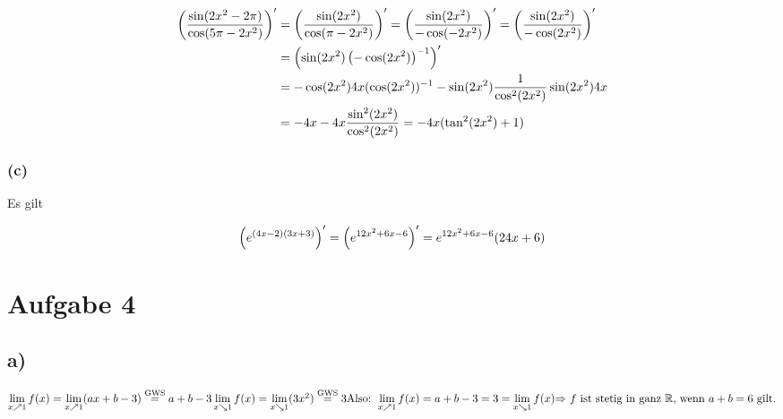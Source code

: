 \documentclass[a4paper, 11pt]{article}
\begin{document}
\begin{align*}
    \left(\frac{\sin(2x^2 - 2\pi)}{\cos(5\pi - 2x^2)}\right)' &=
        \left(\frac{\sin(2x^2)}{\cos(\pi - 2x^2)}\right)' =
        \left(\frac{\sin(2x^2)}{-\cos(-2x^2)}\right)' =
        \left(\frac{\sin(2x^2)}{-\cos(2x^2)}\right)' \\
    &= \left(\sin(2x^2)\left({-\cos(2x^2)}\right)^{-1}\right)' \\
    &= -\cos(2x^2) 4x (\cos(2x^2))^{-1} -
            \sin(2x^2) \frac{1}{\cos^2(2x^2)} \sin(2x^2) 4x \\
    &= -4x - 4x \frac{\sin^2(2x^2)}{\cos^2(2x^2)} = -4x(\tan^2(2x^2) + 1)
\end{align*}

\subsubsection{(c)}
\label{sec:org5a7f910}
Es gilt

$$ \left(e^{(4x - 2)(3x + 3)}\right)' = \left(e^{12x^2 + 6x - 6}\right)' =
    e^{12x^2 + 6x - 6}(24x + 6) $$

\section{Aufgabe 4}
\label{sec:org6d184ba}
\subsection{a)}
\label{sec:org886c75b}
\begin{math}
    \lim \limits_{x \nearrow 1} f(x) =
        \lim \limits_{x \nearrow 1} (ax + b - 3)
        \overset{\text{GWS}}{=} a + b - 3
    \newline
    \newline
    \lim \limits_{x \searrow 1} f(x) =
        \lim \limits_{x \searrow 1} (3x^2) \overset{\text{GWS}}{=} 3
    \newline
    \newline
    \text{Also: }\lim \limits_{x \nearrow 1} f(x) =
        a + b - 3 = 3 = \lim \limits_{x \searrow 1} f(x)
    \newline
    \text{$\Rightarrow$ $f$ ist stetig in ganz } \R
        \text{, wenn } a + b = 6 \text{ gilt.}
\end{math}

\pagebreak
\end{document}
